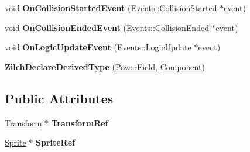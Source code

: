 \begin{DoxyCompactItemize}
\item 
\hypertarget{classDCEngine_1_1Components_1_1PowerField_a6ea5db3edf156877dbc57f5f4327a9a0}{void {\bfseries On\-Collision\-Started\-Event} (\hyperlink{classDCEngine_1_1Events_1_1CollisionStarted}{Events\-::\-Collision\-Started} $\ast$event)}\label{classDCEngine_1_1Components_1_1PowerField_a6ea5db3edf156877dbc57f5f4327a9a0}

\item 
\hypertarget{classDCEngine_1_1Components_1_1PowerField_a58c119f98a79051c6c04bf77be561b76}{void {\bfseries On\-Collision\-Ended\-Event} (\hyperlink{classDCEngine_1_1Events_1_1CollisionEnded}{Events\-::\-Collision\-Ended} $\ast$event)}\label{classDCEngine_1_1Components_1_1PowerField_a58c119f98a79051c6c04bf77be561b76}

\item 
\hypertarget{classDCEngine_1_1Components_1_1PowerField_a5552e9680891c3e267cf9ffe28199670}{void {\bfseries On\-Logic\-Update\-Event} (\hyperlink{classDCEngine_1_1Events_1_1LogicUpdate}{Events\-::\-Logic\-Update} $\ast$event)}\label{classDCEngine_1_1Components_1_1PowerField_a5552e9680891c3e267cf9ffe28199670}

\item 
\hypertarget{classDCEngine_1_1Components_1_1PowerField_a3746e64905312e0685b3c3fb6e7dfc17}{{\bfseries Zilch\-Declare\-Derived\-Type} (\hyperlink{classDCEngine_1_1Components_1_1PowerField}{Power\-Field}, \hyperlink{classDCEngine_1_1Component}{Component})}\label{classDCEngine_1_1Components_1_1PowerField_a3746e64905312e0685b3c3fb6e7dfc17}

\end{DoxyCompactItemize}
\subsection*{Public Attributes}
\begin{DoxyCompactItemize}
\item 
\hypertarget{classDCEngine_1_1Components_1_1PowerField_af6c141ddb76a4cc27ef6d5a0bc3445dd}{\hyperlink{classDCEngine_1_1Components_1_1Transform}{Transform} $\ast$ {\bfseries Transform\-Ref}}\label{classDCEngine_1_1Components_1_1PowerField_af6c141ddb76a4cc27ef6d5a0bc3445dd}

\item 
\hypertarget{classDCEngine_1_1Components_1_1PowerField_a8708231dadd7b548033cd8eda3c78434}{\hyperlink{classDCEngine_1_1Components_1_1Sprite}{Sprite} $\ast$ {\bfseries Sprite\-Ref}}\label{classDCEngine_1_1Components_1_1PowerField_a8708231dadd7b548033cd8eda3c78434}

\end{DoxyCompactItemize}
